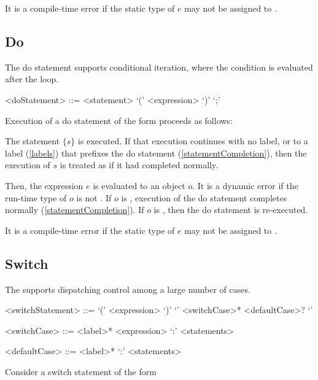\documentclass[makeidx]{article}
\begin{document}
{\LMHash{}%
It is a compile-time error if the static type of $e$ may not be assigned to .


\subsection{Do}

\LMHash{}%
The do statement supports conditional iteration, where the condition is evaluated after the loop.

\begin{grammar}
<doStatement> ::= \DO{} <statement> \WHILE{} `(' <expression> `)' `;'
\end{grammar}

\LMHash{}%
Execution of a do statement of the form  proceeds as follows:

\LMHash{}%
The statement $\{s\}$ is executed.
If that execution continues with no label, or to a label (\ref{labels}) that prefixes the do statement (\ref{statementCompletion}), then the execution of $s$ is treated as if it had completed normally.

\LMHash{}%
Then, the expression $e$ is evaluated to an object $o$.
It is a dynamic error if the run-time type of $o$ is not .
If $o$ is \FALSE{}, execution of the do statement completes normally (\ref{statementCompletion}).
If $o$ is \TRUE{}, then the do statement is re-executed.

\LMHash{}%
It is a compile-time error if the static type of $e$ may not be assigned to .


\subsection{Switch}

\LMHash{}%
The  supports dispatching control among a large number of cases.

\begin{grammar}
<switchStatement> ::= \gnewline{}
  \SWITCH{} `(' <expression> `)' `{' <switchCase>* <defaultCase>? `}'

<switchCase> ::= <label>* \CASE{} <expression> `:' <statements>

<defaultCase> ::= <label>* \DEFAULT{} `:' <statements>
\end{grammar}

\LMHash{}%
Consider a switch statement of the form

}
\end{document}
